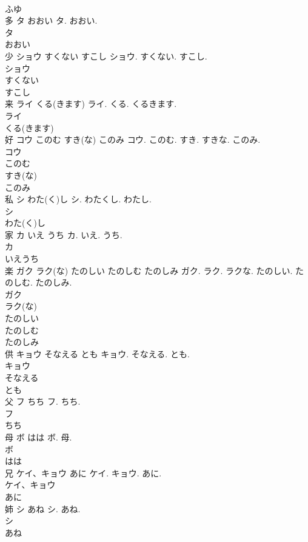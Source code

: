 \documentclass[8pt]{extreport}
\begin{document}
\begin{CJK}{UTF8}{min}
\\	ふゆ
\\	多	タ おおい	タ. おおい.	
\\	タ
\\	おおい
\\	少	ショウ すくない すこし	ショウ. すくない. すこし.	
\\	ショウ
\\	すくない
\\	すこし
\\	来	ライ くる(きます)	ライ. くる. くるきます.	
\\	ライ
\\	くる(きます)
\\	好	コウ このむ すき(な) このみ	コウ. このむ. すき. すきな. このみ.	
\\	コウ
\\	このむ
\\	すき(な)
\\	このみ
\\	私	シ わた(く)し	シ. わたくし. わたし.	
\\	シ
\\	わた(く)し
\\	家	カ いえ うち	カ. いえ. うち.	
\\	カ
\\	いえうち
\\	楽	ガク ラク(な) たのしい たのしむ たのしみ	ガク. ラク. ラクな. たのしい. たのしむ. たのしみ.	
\\	ガク
\\	ラク(な)
\\	たのしい
\\	たのしむ
\\	たのしみ
\\	供	キョウ そなえる とも	キョウ. そなえる. とも.	
\\	キョウ
\\	そなえる
\\	とも
\\	父	フ ちち	フ. ちち.	
\\	フ
\\	ちち
\\	母	ボ はは	ボ. 母.	
\\	ボ
\\	はは
\\	兄	ケイ、キョウ あに	ケイ. キョウ. あに.	
\\	ケイ、キョウ
\\	あに
\\	姉	シ あね	シ. あね.	
\\	シ
\\	あね

\end{CJK}
\end{document}
